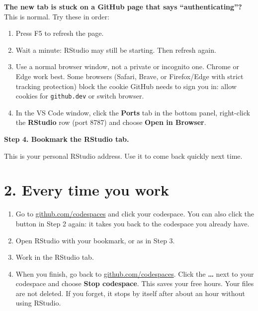 \documentclass[
  letterpaper,
  DIV=11,
  numbers=noendperiod]{scrreprt}
\providecommand{\tightlist}{%
  \setlength{\itemsep}{0pt}\setlength{\parskip}{0pt}}
\begin{document}
\begin{tcolorbox}[enhanced jigsaw, arc=.35mm, bottomrule=.15mm, bottomtitle=1mm, breakable, colback=white, colbacktitle=quarto-callout-tip-color!10!white, colframe=quarto-callout-tip-color-frame, coltitle=black, left=2mm, leftrule=.75mm, opacityback=0, opacitybacktitle=0.6, rightrule=.15mm, title=\textcolor{quarto-callout-tip-color}{\faLightbulb}\hspace{0.5em}{Tip}, titlerule=0mm, toprule=.15mm, toptitle=1mm]

\textbf{The new tab is stuck on a GitHub page that says
``authenticating''?} This is normal. Try these in order:

\begin{enumerate}
\def\labelenumi{\arabic{enumi}.}
\tightlist
\item
  Press F5 to refresh the page.
\item
  Wait a minute: RStudio may still be starting. Then refresh again.
\item
  Use a normal browser window, not a private or incognito one. Chrome or
  Edge work best. Some browsers (Safari, Brave, or Firefox/Edge with
  strict tracking protection) block the cookie GitHub needs to sign you
  in: allow cookies for \texttt{github.dev} or switch browser.
\item
  In the VS Code window, click the \textbf{Ports} tab in the bottom
  panel, right-click the \textbf{RStudio} row (port 8787) and choose
  \textbf{Open in Browser}.
\end{enumerate}

\end{tcolorbox}

\textbf{Step 4. Bookmark the RStudio tab.}

This is your personal RStudio address. Use it to come back quickly next
time.

\section*{2. Every time you work}\label{every-time-you-work}


\begin{enumerate}
\def\labelenumi{\arabic{enumi}.}
\tightlist
\item
  Go to \href{https://github.com/codespaces}{github.com/codespaces} and
  click your codespace. You can also click the button in Step 2 again:
  it takes you back to the codespace you already have.
\item
  Open RStudio with your bookmark, or as in Step 3.
\item
  Work in the RStudio tab.
\item
  When you finish, go back to
  \href{https://github.com/codespaces}{github.com/codespaces}. Click the
  \textbf{\ldots{}} next to your codespace and choose \textbf{Stop
  codespace}. This saves your free hours. Your files are not deleted. If
  you forget, it stops by itself after about an hour without using
  RStudio.
\end{enumerate}
\end{document}
